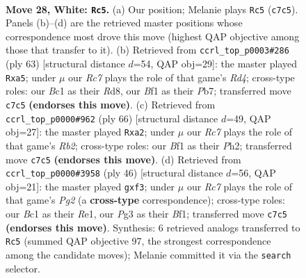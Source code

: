 \documentclass[11pt]{article}
\begin{document}
\clearpage

\begin{figure}[p]\centering
\begin{subfigure}{0.46\textwidth}\centering
\resizebox{\linewidth}{!}{%
\newchessgame
\chessboard[
  setfen={1r1r4/pbRp1pk1/8/4p2p/8/5nP1/PP3P1P/2BK1B1R w - - 4 28},
  showmover=false,
  pgfstyle=straightmove, color=movearrow, markmove={c7-c5}
]}
\caption{}
\end{subfigure}\hfill
\begin{subfigure}{0.46\textwidth}\centering
\resizebox{\linewidth}{!}{%
\newchessgame
\chessboard[
  setfen={3r4/1p1b1pk1/6p1/P2r3p/2pNR2P/2P5/1P3PPK/4R3 b - - 0 32},
  showmover=false,
  pgfstyle=straightmove, color=movearrow, markmove={d5-a5}
]}
\caption{}
\end{subfigure}
\\[4pt]
\begin{subfigure}{0.46\textwidth}\centering
\resizebox{\linewidth}{!}{%
\newchessgame
\chessboard[
  setfen={8/2r2pkp/2r5/2n1p3/4P3/2P1R1P1/bR2B2P/4K3 w - - 0 34},
  showmover=false,
  pgfstyle=straightmove, color=movearrow, markmove={b2-a2}
]}
\caption{}
\end{subfigure}\hfill
\begin{subfigure}{0.46\textwidth}\centering
\resizebox{\linewidth}{!}{%
\newchessgame
\chessboard[
  setfen={5rr1/pb1k1p1p/1p6/2pn4/8/5nB1/PPP2NP1/2K1RB1R w - - 8 24},
  showmover=false,
  pgfstyle=straightmove, color=movearrow, markmove={g2-f3}
]}
\caption{}
\end{subfigure}
\caption{\textbf{Move 28, White: \texttt{Rc5}.} (a) Our position; Melanie plays \texttt{Rc5} (\texttt{c7c5}). Panels (b)--(d) are the retrieved master positions whose correspondence most drove this move (highest QAP objective among those that transfer to it). (b) Retrieved from \texttt{ccrl\_top\_p0003\#286} (ply 63) [structural distance $d$=54, QAP obj=29]: the master played \texttt{Rxa5}; under $\mu$ our \emph{Rc7} plays the role of that game's \emph{Rd4}; cross-type roles: our \emph{B}c1 as their \emph{R}d8, our \emph{B}f1 as their \emph{P}b7; transferred move \texttt{c7c5} \textbf{(endorses this move)}. (c) Retrieved from \texttt{ccrl\_top\_p0000\#962} (ply 66) [structural distance $d$=49, QAP obj=27]: the master played \texttt{Rxa2}; under $\mu$ our \emph{Rc7} plays the role of that game's \emph{Rb2}; cross-type roles: our \emph{B}f1 as their \emph{P}h2; transferred move \texttt{c7c5} \textbf{(endorses this move)}. (d) Retrieved from \texttt{ccrl\_top\_p0000\#3958} (ply 46) [structural distance $d$=56, QAP obj=21]: the master played \texttt{gxf3}; under $\mu$ our \emph{Rc7} plays the role of that game's \emph{Pg2} (a \textbf{cross-type} correspondence); cross-type roles: our \emph{B}c1 as their \emph{R}e1, our \emph{P}g3 as their \emph{B}f1; transferred move \texttt{c7c5} \textbf{(endorses this move)}. Synthesis: 6 retrieved analogs transferred to \texttt{Rc5} (summed QAP objective 97, the strongest correspondence among the candidate moves); Melanie committed it via the \texttt{search} selector.}
\label{fig:thought-m54}
\end{figure}
\end{document}
